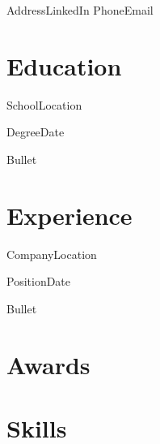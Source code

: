\documentclass{yalcv}
\begin{document}
         {Address}{LinkedIn}
         {Phone}{Email}

\section*{Education}

\begin{cvschool}{School}{Location}
    \begin{cvdegree}{Degree}{Date}
        \item Bullet
    \end{cvdegree}
\end{cvschool}

\section*{Experience}

\begin{cvjob}{Company}{Location}
    \begin{cvposition}{Position}{Date}
        \item Bullet
    \end{cvposition}
\end{cvjob}

\section*{Awards}


\section*{Skills}

\begin{cvskills}
\end{cvskills}
\end{document}
